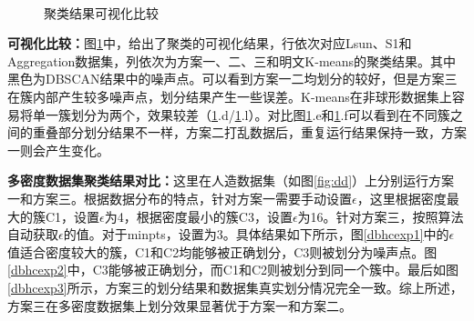 \begin{figure}[htb]
	\\
	\caption{聚类结果可视化比较}
	\label{s4-img-clures}
\end{figure}

\textbf{可视化比较：}图\ref{s4-img-clures}中，给出了聚类的可视化结果，行依次对应Lsun、S1和Aggregation数据集，列依次为方案一、二、三和明文K-means的聚类结果。其中黑色为DBSCAN结果中的噪声点。可以看到方案一二均划分的较好，但是方案三在簇内部产生较多噪声点，划分结果产生一些误差。K-means在非球形数据集上容易将单一簇划分为两个，效果较差（\ref{s4-img-clures}.d/\ref{s4-img-clures}.l）。对比图\ref{s4-img-clures}.e和\ref{s4-img-clures}.f可以看到在不同簇之间的重叠部分划分结果不一样，方案二打乱数据后，重复运行结果保持一致，方案一则会产生变化。

\textbf{多密度数据集聚类结果对比：}这里在人造数据集（如图\ref{fig:dd}）上分别运行方案一和方案三。根据数据分布的特点，针对方案一需要手动设置$ \epsilon $，这里根据密度最大的簇C1，设置$ \epsilon $为4，根据密度最小的簇C3，设置$ \epsilon $为16。针对方案三，按照算法自动获取$ \epsilon $的值。对于minpts，设置为3。具体结果如下所示，图\ref{dbhcexp1}中的$ \epsilon $值适合密度较大的簇，C1和C2均能够被正确划分，C3则被划分为噪声点。图\ref{dbhcexp2}中，C3能够被正确划分，而C1和C2则被划分到同一个簇中。最后如图\ref{dbhcexp3}所示，方案三的划分结果和数据集真实划分情况完全一致。综上所述，方案三在多密度数据集上划分效果显著优于方案一和方案二。


